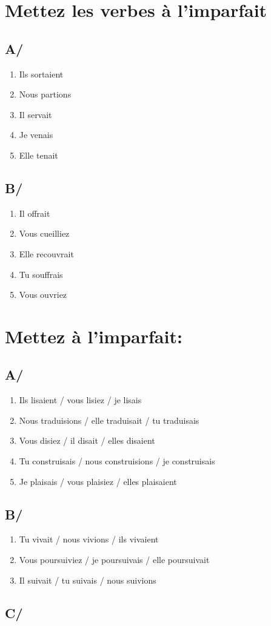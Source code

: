 \section{Mettez les verbes à l'imparfait}

\subsection{A/}

\begin{enumerate}
    \item Ils sortaient
    \item Nous partions
    \item Il servait
    \item Je venais
    \item Elle tenait
\end{enumerate}

\subsection{B/}

\begin{enumerate}
    \item Il offrait
    \item Vous cueilliez
    \item Elle recouvrait
    \item Tu souffrais
    \item Vous ouvriez
\end{enumerate}

\section{Mettez à l'imparfait:}

\subsection{A/}

\begin{enumerate}
    \item Ils lisaient / vous lisiez / je lisais
    \item Nous traduisions / elle traduisait / tu traduisais
    \item Vous disiez / il disait / elles disaient
    \item Tu construisais / nous construisions / je construisais
    \item Je plaisais / vous plaisiez / elles plaisaient 
\end{enumerate}

\subsection{B/}

\begin{enumerate}
    \item Tu vivait / nous vivions / ils vivaient
    \item Vous poursuiviez / je poursuivais / elle poursuivait
    \item Il suivait / tu suivais / nous suivions
\end{enumerate}

\subsection{C/}